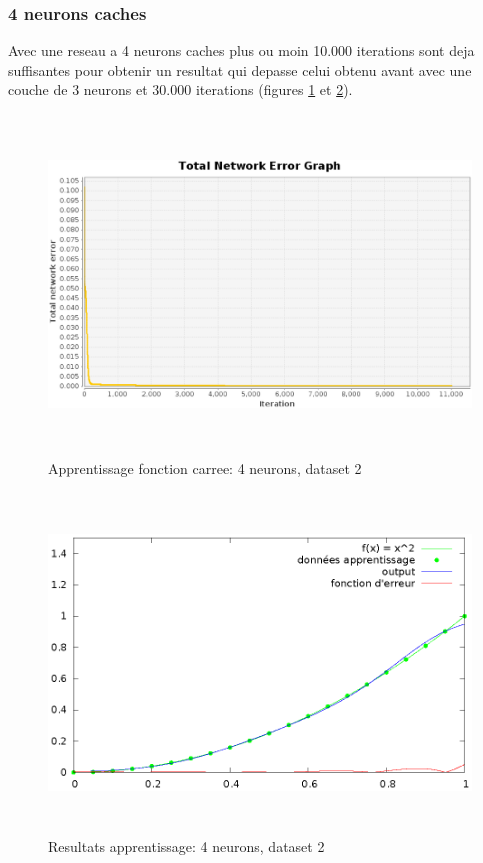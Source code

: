 \documentclass[twoside,openright,a4paper,11pt,french]{article}
\begin{document}
\subsubsection{4 neurons caches}

Avec une reseau a 4 neurons caches plus ou moin 10.000 iterations
sont deja suffisantes pour obtenir un resultat qui depasse celui obtenu
avant avec une couche de 3 neurons et 30.000 iterations 
(figures \ref{fig:sqtest4} et \ref{fig:chartsqtest4}).


\begin{figure}[ht]
\centering
\includegraphics[width=12cm,height=9cm]{./pics/sqtest4.eps}
\caption{Apprentissage fonction carree: 4 neurons, dataset 2}
\label{fig:sqtest4}
\end{figure}

\begin{figure}[ht]
\centering
\includegraphics[width=12cm,height=9cm]{./pics/chartsqtest4.eps}
\caption{Resultats apprentissage: 4 neurons, dataset 2}
\label{fig:chartsqtest4}
\end{figure}
\end{document}
